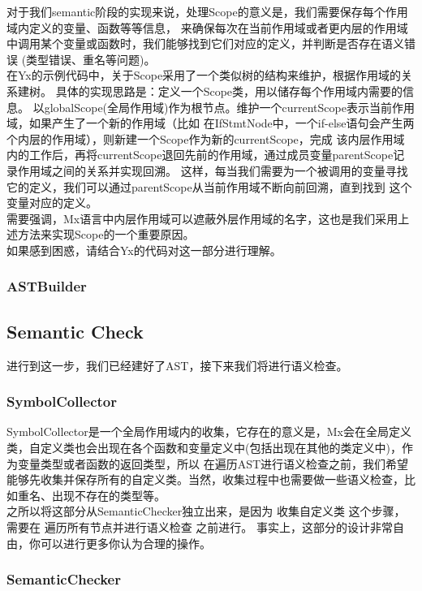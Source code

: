 对于我们semantic阶段的实现来说，处理Scope的意义是，我们需要保存每个作用域内定义的变量、函数等等信息，
来确保每次在当前作用域或者更内层的作用域中调用某个变量或函数时，我们能够找到它们对应的定义，并判断是否存在语义错误
(类型错误、重名等问题)。\\

在Yx的示例代码中，关于Scope采用了一个类似树的结构来维护，根据作用域的关系建树。
具体的实现思路是：定义一个Scope类，用以储存每个作用域内需要的信息。
以globalScope(全局作用域)作为根节点。维护一个currentScope表示当前作用域，如果产生了一个新的作用域（比如
在IfStmtNode中，一个if-else语句会产生两个内层的作用域），则新建一个Scope作为新的currentScope，完成
该内层作用域内的工作后，再将currentScope退回先前的作用域，通过成员变量parentScope记录作用域之间的关系并实现回溯。
这样，每当我们需要为一个被调用的变量寻找它的定义，我们可以通过parentScope从当前作用域不断向前回溯，直到找到
这个变量对应的定义。\\

需要强调，Mx语言中内层作用域可以遮蔽外层作用域的名字，这也是我们采用上述方法来实现Scope的一个重要原因。\\

如果感到困惑，请结合Yx的代码对这一部分进行理解。

\subsubsection{ASTBuilder}


\subsection{Semantic Check}
进行到这一步，我们已经建好了AST，接下来我们将进行语义检查。\\

\subsubsection{SymbolCollector}
SymbolCollector是一个全局作用域内的收集，它存在的意义是，Mx会在全局定义类，自定义类也会出现在各个函数和变量定义中(包括出现在其他的类定义中)，作为变量类型或者函数的返回类型，所以
在遍历AST进行语义检查之前，我们希望能够先收集并保存所有的自定义类。当然，收集过程中也需要做一些语义检查，比如重名、出现不存在的类型等。 \\

之所以将这部分从SemanticChecker独立出来，是因为 收集自定义类 这个步骤，需要在 遍历所有节点并进行语义检查 之前进行。
事实上，这部分的设计非常自由，你可以进行更多你认为合理的操作。

\subsubsection{SemanticChecker}





